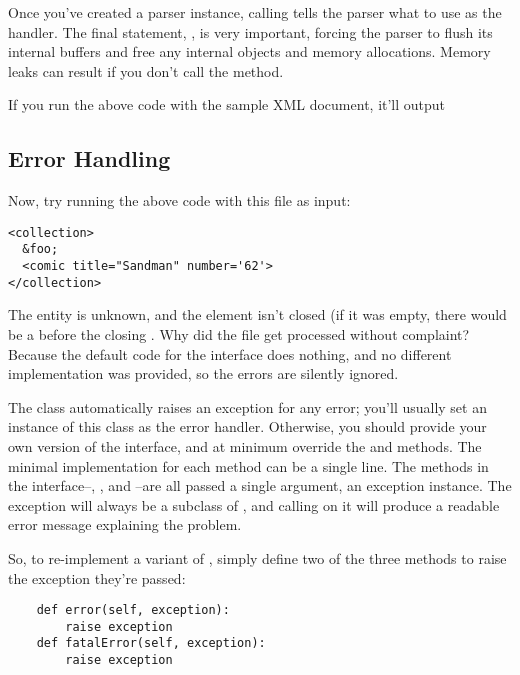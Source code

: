 \documentclass{howto}
\newcommand{\element}[1]{\code{#1}}
\begin{document}
Once you've created a parser instance, calling
 tells the parser what to use as the
handler.  The final statement, , is very
important, forcing the parser to flush its internal buffers and free
any internal objects and memory allocations.  Memory leaks can result
if you don't call the  method.

If you run the above code with the sample XML document, it'll output

\subsection{Error Handling}

Now, try running the above code with this file as input:
\begin{verbatim}
<collection>
  &foo;
  <comic title="Sandman" number='62'>
</collection>
\end{verbatim}

The  entity is unknown, and the \element{comic} element
isn't closed (if it was empty, there would be a \samp{/} before the
closing \samp{>}.  Why did the file get processed without complaint?
Because the default code for the  interface does
nothing, and no different implementation was provided, so the errors
are silently ignored.

The  class automatically raises an exception for
any error; you'll usually set an instance of this class as the error
handler.  Otherwise, you should provide your own version of the
 interface, and at minimum override the
 and  methods.  The minimal
implementation for each method can be a single line.  The methods in
the  interface--, ,
and --are all passed a single argument, an
exception instance.  The exception will always be a subclass of
, and calling  on it will produce
a readable error message explaining the problem.

So, to re-implement a variant of , simply define
two of the three methods to raise the exception they're passed:

\begin{verbatim}
    def error(self, exception):
        raise exception
    def fatalError(self, exception):
        raise exception
\end{verbatim}
\end{document}
